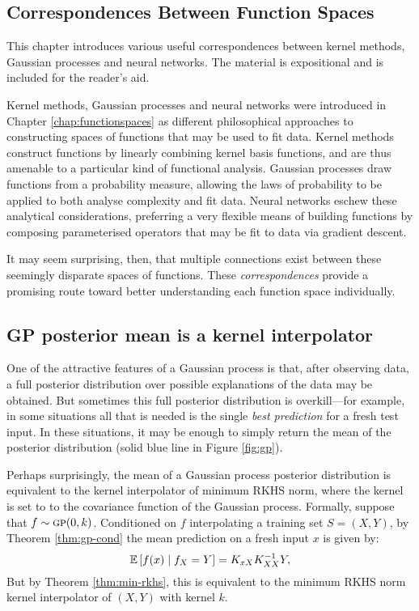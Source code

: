 \begin{refsection}

\chapter{Correspondences Between Function Spaces}
\label{chap:correspondences}

\begin{tcolorbox}
This chapter introduces various useful correspondences between kernel methods, Gaussian processes and neural networks. The material is expositional and is included for the reader's aid.
\end{tcolorbox}

Kernel methods, Gaussian processes and neural networks were introduced in Chapter \ref{chap:functionspaces} as different philosophical approaches to constructing spaces of functions that may be used to fit data. Kernel methods construct functions by linearly combining kernel basis functions, and are thus amenable to a particular kind of functional analysis. Gaussian processes draw functions from a probability measure, allowing the laws of probability to be applied to both analyse complexity and fit data. Neural networks eschew these analytical considerations, preferring a very flexible means of building functions by composing parameterised operators that may be fit to data via gradient descent.

It may seem surprising, then, that multiple connections exist between these seemingly disparate spaces of functions. These \textit{correspondences} provide a promising route toward better understanding each function space individually.

\section{GP posterior mean is a kernel interpolator}
\label{sec:gp-k-mean}

One of the attractive features of a Gaussian process is that, after observing data, a full posterior distribution over possible explanations of the data may be obtained. But sometimes this full posterior distribution is overkill---for example, in some situations all that is needed is the single \textit{best prediction} for a fresh test input. In these situations, it may be enough to simply return the mean of the posterior distribution (solid blue line in Figure \ref{fig:gp}). 

Perhaps surprisingly, the mean of a Gaussian process posterior distribution is equivalent to the kernel interpolator of minimum RKHS norm, where the kernel is set to to the covariance function of the Gaussian process. Formally, suppose that $f\sim\textsc{gp}(0,k)$. Conditioned on $f$ interpolating a training set $S=(X,Y)$, by Theorem \ref{thm:gp-cond} the mean prediction on a fresh input $x$ is given by:
\begin{equation}\label{eq:gp-cond-mean}
    \operatorname{\mathbb{E}}\left[f(x)\mid f_X = Y\right] = K_{xX}K_{XX}^{-1}Y,
\end{equation}
But by Theorem \ref{thm:min-rkhs}, this is equivalent to the minimum RKHS norm kernel interpolator of $(X,Y)$ with kernel $k$.


\end{refsection}
